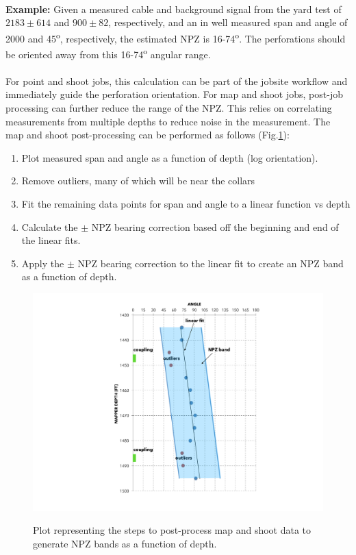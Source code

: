 \documentclass[paper=a4, fontsize=11pt]{scrartcl}
\numberwithin{equation}{section}		%
\numberwithin{figure}{section}			%
\numberwithin{table}{section}				%
\begin{document}
\paragraph{}
\textbf{Example:} Given a measured cable and background signal from the yard test of ${2183\pm614}$ and ${900\pm82}$, respectively, and an in well measured span and angle of 2000 and 45\textsuperscript{o}, respectively, the estimated NPZ is 16-74\textsuperscript{o}.  The perforations should be oriented away from this 16-74\textsuperscript{o} angular range.

\paragraph{}
For point and shoot jobs, this calculation can be part of the jobsite workflow and immediately guide the perforation orientation.  For map and shoot jobs, post-job processing can further reduce the range of the NPZ.  This relies on correlating measurements from multiple depths to reduce noise in the measurement.  The map and shoot post-processing can be performed as follows (Fig.\ref{fig:map_shoot}):
\begin{enumerate}
    \item Plot measured span and angle as a function of depth (log orientation).
    \item Remove outliers, many of which will be near the collars
    \item Fit the remaining data points for span and angle to a linear function vs depth
    \item Calculate the $\pm$ NPZ bearing correction based off the beginning and end of the linear fits.
    \item Apply the $\pm$ NPZ bearing correction to the linear fit to create an NPZ band as a function of depth.
\end{enumerate}

\begin{figure}[h!]
    \caption{Plot representing the steps to post-process map and shoot data to generate NPZ bands as a function of depth.}
    \centering
    \includegraphics[width=1.0\textwidth]{figures/map_shoot.pdf}
    \label{fig:map_shoot}
\end{figure}
\end{document}
